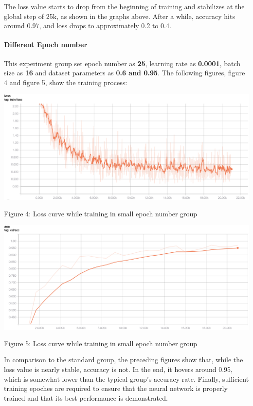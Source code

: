 \documentclass[11pt]{article}
\begin{document}
    The loss value starts to drop from the beginning of training and
stabilizes at the global step of 25k, as shown in the graphs above.
After a while, accuracy hits around 0.97, and loss drops to
approximately 0.2 to 0.4.

    \hypertarget{different-epoch-number}{%
\paragraph{Different Epoch number}\label{different-epoch-number}}

This experiment group set epoch number as \textbf{25}, learning rate as
\textbf{0.0001}, batch size as \textbf{16} and dataset parameters as
\textbf{0.6 and 0.95}. The following figures, figure 4 and figure 5,
show the training process:

    \includegraphics{../pics/Epoch_1.png}

Figure 4: Loss curve while training in small epoch number group

\includegraphics{../pics/Epoch_2.png}

Figure 5: Loss curve while training in small epoch number group

    In comparison to the standard group, the preceding figures show that,
while the loss value is nearly stable, accuracy is not. In the end, it
hovers around 0.95, which is somewhat lower than the typical group's
accuracy rate. Finally, sufficient training epoches are required to
ensure that the neural network is properly trained and that its best
performance is demonstrated.
\end{document}
